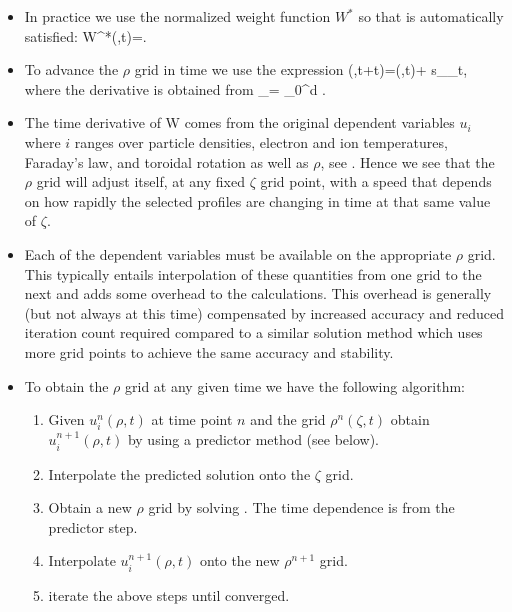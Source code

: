  \begin{itemize}
 \item   In practice we use the normalized 
 weight  function $W^* $ so that  is automatically
 satisfied:
 \beq
  W^*(\zeta,t)=.
 \eeq 
 \item To advance the $\rho$ grid in time we use the expression
 \beq
  \rho(\zeta,t+\Delta t)=\rho(\zeta,t)+
  s_\rho{}\bigg \vert_\zeta \Delta t,
              \label{srhoeq}
 \eeq
 where the derivative is obtained from
 \beq
  \bigg \vert_\zeta = 
    \int_0^\zeta {}d\zeta
  \label{drhodt}.
 \eeq    
 \item The time derivative of W comes from  the original  dependent variables
 $u_i$ where $i$ ranges over particle densities, electron and ion temperatures, Faraday's law, and toroidal rotation as well as $\rho$, see .
 Hence we see that the $\rho  $ grid will adjust itself, at any fixed $\zeta$ 
 grid point,  with a speed that depends on how rapidly the selected profiles are
 changing in time at that same value of $\zeta$.  
\end{itemize}

\begin{itemize}
 \item   Each of the dependent variables  must be  available on the appropriate
 $\rho$ grid. This typically entails interpolation of  these quantities from one
 grid to the next and adds some overhead to the calculations. This overhead is
 generally (but not always at this time)  compensated by increased accuracy and
 reduced iteration count required compared to a similar solution method which 
 uses more grid points to achieve the same  accuracy and stability.
 \item  To obtain the $\rho$ grid at any given time we have
 the following algorithm:  
 \begin{enumerate}
  \item Given $u_i^n(\rho,t)$ at time point $n$ and the grid $\rho^n(\zeta,t)$
  obtain $u_i^{n+1}(\rho,t)$ by using a predictor method (see below).
  \item Interpolate the predicted solution onto the $\zeta$ grid.
  \item Obtain a new $\rho $ grid by solving . The time dependence 
  is from the predictor step.
  \item Interpolate $u_i^{n+1}(\rho,t) $ onto the new  $\rho^{n+1}$ grid.
  \item iterate the above steps until converged.
 \end{enumerate}     
\end{itemize}


